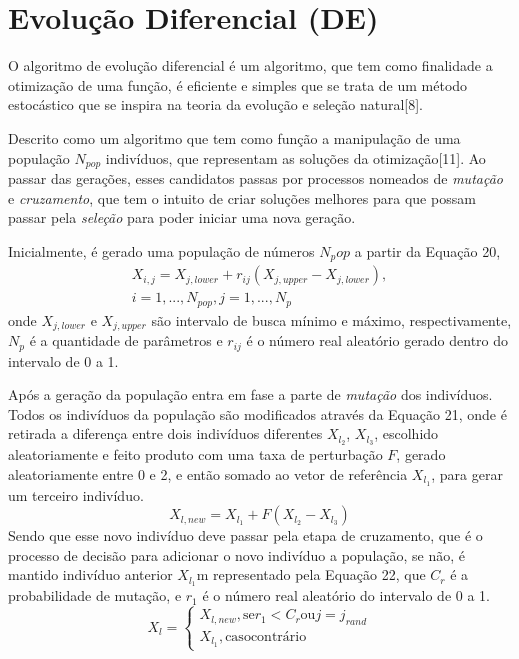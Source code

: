 \documentclass[por]{Template_SBEF}
\begin{document}
\section{Evolução Diferencial (DE)}
O algoritmo de evolução diferencial é um algoritmo, que tem como finalidade a otimização de uma função, é eficiente e simples que se trata de um método estocástico que se inspira na teoria da evolução e seleção natural[8].

Descrito como um algoritmo que tem como função a manipulação de uma população $N_{pop}$ indivíduos, que representam as soluções da otimização[11]. Ao passar das gerações, esses candidatos passas por processos nomeados de \textit{mutação} e \textit{cruzamento}, que tem o intuito de criar soluções melhores para que possam passar pela \textit{seleção} para poder iniciar uma nova geração.

Inicialmente, é gerado uma população de números $N_pop$ a partir da Equação 20,
\begin{equation}
\begin{split}
X_{i,j}=X_{j,lower}+r_{ij} (X_{j,upper}-X_{j,lower}),\\
i = 1,...,N_{pop}, j =1, ..., N_p
\end{split}
\end{equation}
onde $X_{j,lower}$ e $X_{j,upper}$ são intervalo de busca mínimo e máximo, respectivamente, $N_p$ é a quantidade de parâmetros e $r_{ij}$ é o número real aleatório gerado dentro do intervalo de 0 a 1.

Após a geração da população entra em fase a parte de \textit{mutação} dos indivíduos. Todos os indivíduos da população são modificados através da Equação 21, onde é retirada a diferença entre dois indivíduos  diferentes $X_{l_2}$, $X_{l_3}$, escolhido aleatoriamente e feito produto com uma taxa de perturbação $F$, gerado aleatoriamente entre 0 e 2, e então somado ao vetor de referência $X_{l_1}$, para gerar um terceiro indivíduo.
\begin{equation}
X_{l,new}=X_{l_1} + F(X_{l_2} - X_{l_3})
\end{equation}
Sendo que esse novo indivíduo deve passar pela etapa de cruzamento, que é o processo de decisão para adicionar o novo indivíduo a população, se não, é mantido  indivíduo anterior $X_{l_1}$m representado pela Equação 22, que $C_r$ é a probabilidade de mutação, e $r_1$ é o número real aleatório do intervalo de 0 a 1.
\begin{equation}
X_l= \left\{\begin{matrix}
X_{l,new}, \mathrm{se} r_1 < C_r \mathrm{ou} j = j_{rand}
\\ X_{l_1}, \mathrm{caso contrário}

\end{matrix}\right.
\end{equation}
\end{document}
